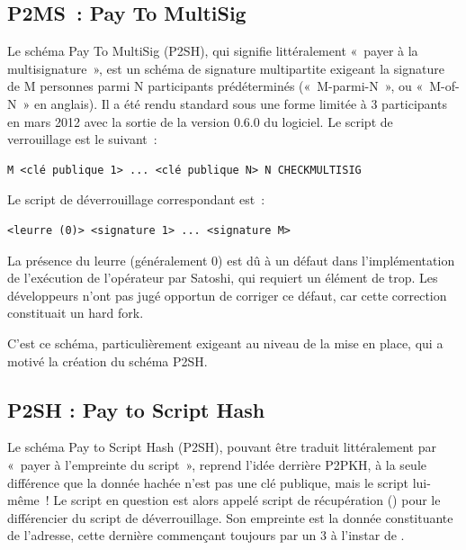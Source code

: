 \subsection{P2MS~: Pay To MultiSig} Le schéma Pay To MultiSig (P2SH), qui signifie littéralement «~payer à la multisignature~», est un schéma de signature multipartite exigeant la signature de M personnes parmi N participants prédéterminés («~M-parmi-N~», ou «~M-of-N~» en anglais). Il a été rendu standard sous une forme limitée à 3 participants en mars 2012 avec la sortie de la version 0.6.0 du logiciel. Le script de verrouillage est le suivant~:

\begin{Verbatim}[fontsize=\footnotesize]
M <clé publique 1> ... <clé publique N> N CHECKMULTISIG
\end{Verbatim}

Le script de déverrouillage correspondant est~:

\begin{Verbatim}[fontsize=\footnotesize]
<leurre (0)> <signature 1> ... <signature M>
\end{Verbatim}

La présence du leurre (généralement 0) est dû à un défaut dans l'implémentation de l'exécution de l'opérateur  par Satoshi, qui requiert un élément de trop. Les développeurs n'ont pas jugé opportun de corriger ce défaut, car cette correction constituait un hard fork.

C'est ce schéma, particulièrement exigeant au niveau de la mise en place, qui a motivé la création du schéma P2SH.

\subsection{P2SH : Pay to Script Hash} Le schéma Pay to Script Hash (P2SH), pouvant être traduit littéralement par «~payer à l'empreinte du script~», reprend l'idée derrière P2PKH, à la seule différence que la donnée hachée n'est pas une clé publique, mais le script lui-même~! Le script en question est alors appelé script de récupération () pour le différencier du script de déverrouillage. Son empreinte est la donnée constituante de l'adresse, cette dernière commençant toujours par un 3 à l'instar de .

